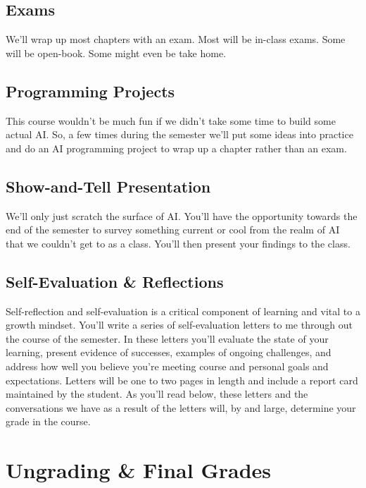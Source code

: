\documentclass[10pt]{article}
\begin{document}
\subsection*{Exams}

We'll wrap up most chapters with an exam. Most will be in-class exams. Some will be open-book. Some might even be take home.

\subsection*{Programming Projects}

This course wouldn't be much fun if we didn't take some time to build some actual AI.  So, a few times during the semester we'll put some ideas into practice and do an AI programming project to wrap up a chapter rather than an exam.

\subsection*{Show-and-Tell Presentation}

We'll only just scratch the surface of AI. You'll have the opportunity towards the end of the semester to survey something current or cool from the realm of AI that we couldn't get to as a class. You'll then present your findings to the class.

\subsection*{Self-Evaluation \& Reflections}

Self-reflection and self-evaluation is a critical component of learning and vital to a growth mindset. You'll write a series of self-evaluation letters to me through out the course of the semester. In these letters you'll evaluate the state of your learning, present evidence of successes, examples of ongoing challenges, and address how well you believe you're meeting course and personal goals and expectations. Letters will be one to two pages in length and include a report card maintained by the student. As you'll read below, these letters and the conversations we have as a result of the letters will, by and large, determine your grade in the course.


\section{Ungrading \& Final Grades}
\end{document}
